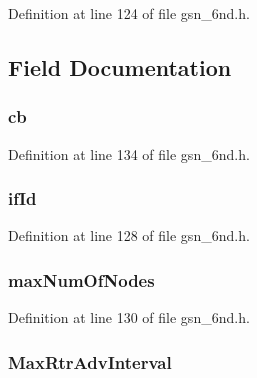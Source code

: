 Definition at line 124 of file gsn\_\-6nd.h.



\subsection{Field Documentation}
\hypertarget{a00193_a8bde91b6ce377d59f0b80c03bdd469b9}{
\subsubsection[{cb}]{ {\bf cb}}}
\label{a00193_a8bde91b6ce377d59f0b80c03bdd469b9}


Definition at line 134 of file gsn\_\-6nd.h.

\hypertarget{a00193_a0f9aaec90ed26330a798d110bc4bc237}{
\subsubsection[{ifId}]{ {\bf ifId}}}
\label{a00193_a0f9aaec90ed26330a798d110bc4bc237}


Definition at line 128 of file gsn\_\-6nd.h.

\hypertarget{a00193_a53dccd30559b2a4bdf7c48d3f71bc8d3}{
\subsubsection[{maxNumOfNodes}]{ {\bf maxNumOfNodes}}}
\label{a00193_a53dccd30559b2a4bdf7c48d3f71bc8d3}


Definition at line 130 of file gsn\_\-6nd.h.

\hypertarget{a00193_aeac054366f1a4a6cc391b9385dcf1f9a}{
\subsubsection[{MaxRtrAdvInterval}]{ {\bf MaxRtrAdvInterval}}}
\label{a00193_aeac054366f1a4a6cc391b9385dcf1f9a}


